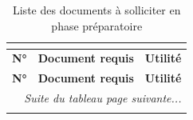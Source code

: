 \begin{longtable}{|c|p{8.5cm}|p{3.5cm}|}
    \caption{Liste des documents à solliciter en phase préparatoire} \\
    \label{tab:docs-solliciter} \\
    \hline
    \rowcolor{gray!20}
    \textbf{N°} & \textbf{Document requis} & \textbf{Utilité} \\ \hline
    \endfirsthead
    
    \hline
    \rowcolor{gray!20}
    \textbf{N°} & \textbf{Document requis} & \textbf{Utilité} \\ \hline
    \endhead
    
    \hline
    \multicolumn{3}{r}{\footnotesize \textit{Suite du tableau page suivante...}} \\
    \endfoot
    
    \hline
    \endlastfoot
    

\end{longtable}
